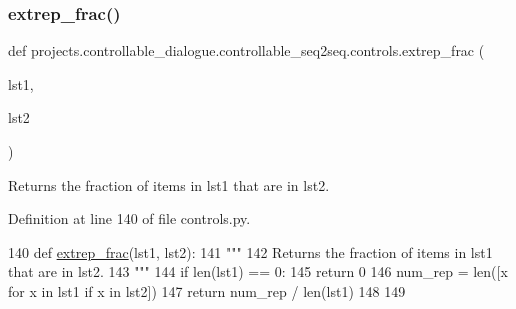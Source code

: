 \mbox{\label{namespaceprojects_1_1controllable__dialogue_1_1controllable__seq2seq_1_1controls_a24fbafb2553fb93db247bb7e2339b1e4}} 
\subsubsection{\texorpdfstring{extrep\+\_\+frac()}{extrep\_frac()}}
{\footnotesize\ttfamily def projects.\+controllable\+\_\+dialogue.\+controllable\+\_\+seq2seq.\+controls.\+extrep\+\_\+frac (\begin{DoxyParamCaption}\item[{}]{lst1,  }\item[{}]{lst2 }\end{DoxyParamCaption})}

\begin{DoxyVerb}Returns the fraction of items in lst1 that are in lst2.
\end{DoxyVerb}
 

Definition at line 140 of file controls.\+py.


\begin{DoxyCode}
140 \textcolor{keyword}{def }\hyperlink{namespaceprojects_1_1controllable__dialogue_1_1controllable__seq2seq_1_1controls_a24fbafb2553fb93db247bb7e2339b1e4}{extrep\_frac}(lst1, lst2):
141     \textcolor{stringliteral}{"""}
142 \textcolor{stringliteral}{    Returns the fraction of items in lst1 that are in lst2.}
143 \textcolor{stringliteral}{    """}
144     \textcolor{keywordflow}{if} len(lst1) == 0:
145         \textcolor{keywordflow}{return} 0
146     num\_rep = len([x \textcolor{keywordflow}{for} x \textcolor{keywordflow}{in} lst1 \textcolor{keywordflow}{if} x \textcolor{keywordflow}{in} lst2])
147     \textcolor{keywordflow}{return} num\_rep / len(lst1)
148 
149 
\end{DoxyCode}
\mbox{\label{namespaceprojects_1_1controllable__dialogue_1_1controllable__seq2seq_1_1controls_a5bc41cc6c701b5da46a74b17ead0e834}} 
